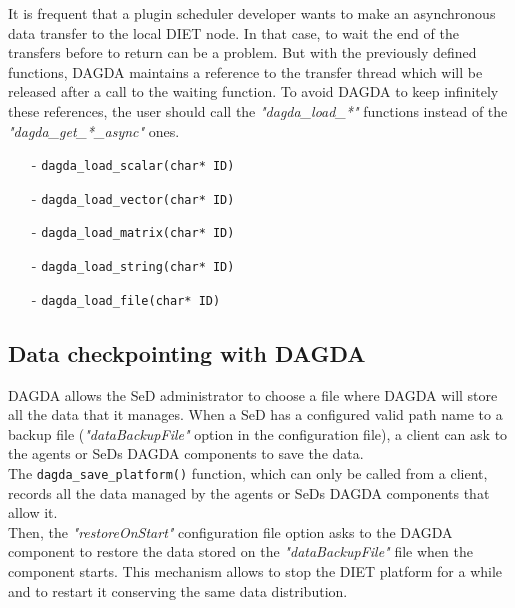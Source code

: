 It is frequent that a plugin scheduler developer wants to make an asynchronous
data transfer to the local DIET node. In that case, to wait the end of the
transfers before to return can be a problem. But with the previously defined
functions, DAGDA maintains a reference to the transfer thread which will be
released after a call to the waiting function. To avoid DAGDA to keep
infinitely these references, the user should call the \textit{"dagda\_load\_*"}
functions instead of the \textit{"dagda\_get\_*\_async"} ones.

\begin{itemize}
\item[-] \verb#dagda_load_scalar(char* ID)#
\item[-] \verb#dagda_load_vector(char* ID)#
\item[-] \verb#dagda_load_matrix(char* ID)#
\item[-] \verb#dagda_load_string(char* ID)#
\item[-] \verb#dagda_load_file(char* ID)#
\end{itemize}

\subsection{Data checkpointing with DAGDA}
DAGDA allows the SeD administrator to choose a file where DAGDA will store
all the data that it manages. When a SeD has a configured valid path name to a
backup file (\textit{"dataBackupFile"} option in the configuration file),
a client can ask to the agents or SeDs DAGDA components to save the data.\\

The \verb#dagda_save_platform()# function, which can only be
called from a client, records all the data managed by the agents or SeDs DAGDA
components that allow it.\\
Then, the \textit{"restoreOnStart"} configuration file option asks to the
DAGDA component to restore the data stored on the \textit{"dataBackupFile"}
file when the component starts. This mechanism allows to stop the DIET
platform for a while and to restart it conserving the same data distribution.

